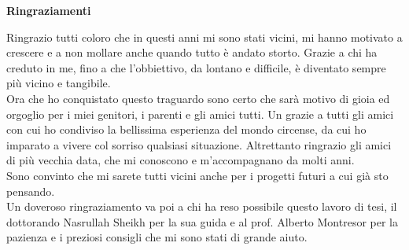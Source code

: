 \thispagestyle{empty}

\begin{center}
  {\bf \Huge Ringraziamenti}
\end{center}

\vspace{2cm}
\noindent Ringrazio tutti coloro che in questi anni mi sono stati vicini, mi hanno motivato a crescere e a non mollare anche quando tutto è andato storto. Grazie a chi ha creduto in me, fino a che l'obbiettivo, da lontano e difficile, è diventato sempre più vicino e tangibile.\\
Ora che ho conquistato questo traguardo sono certo che sarà motivo di gioia ed orgoglio per i miei genitori, i parenti e gli amici tutti. Un grazie a tutti gli amici con cui ho condiviso la bellissima esperienza del mondo circense, da cui ho imparato a vivere col sorriso qualsiasi situazione. Altrettanto ringrazio gli amici di più vecchia data, che mi conoscono e m'accompagnano da molti anni.\\
Sono convinto che mi sarete tutti vicini anche per i progetti futuri a cui già sto pensando.\\
Un doveroso ringraziamento va poi a chi ha reso possibile questo lavoro di tesi, il dottorando Nasrullah Sheikh per la sua guida e al prof. Alberto Montresor per la pazienza e i preziosi consigli che mi sono stati di grande aiuto.
